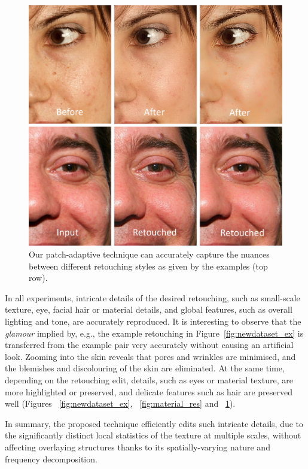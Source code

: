 \begin{figure}[th] %
    \centering
	\includegraphics[width=\columnwidth]{Chapters/detail-retouching-figs/Nuances.pdf}
    \caption{Our patch-adaptive technique can accurately capture the nuances between different
    retouching styles as given by the examples (top row).}
\label{fig:retouchingstyles}
\end{figure}

In all experiments, intricate details of the desired retouching, such as small-scale texture, eye, facial hair or material details, and global features, such as overall lighting and tone, are accurately reproduced. It is interesting to observe that the \emph{glamour} implied by, e.g., the example retouching in Figure~\ref{fig:newdataset_ex} is transferred from the example pair very accurately without causing an artificial look. Zooming into the skin reveals that pores and wrinkles are minimised, and the blemishes and discolouring of the skin are eliminated. At the same time, depending on the retouching edit, details, such as eyes or material texture, are more highlighted or preserved, and delicate features such as hair are preserved well (Figures ~\ref{fig:newdataset_ex}, ~\ref{fig:material_res} and ~\ref{fig:retouchingstyles}). 


In summary, the proposed technique efficiently edits such intricate details, due to the significantly distinct local statistics of the texture at multiple scales, without affecting overlaying structures thanks to its spatially-varying nature and frequency decomposition. 

